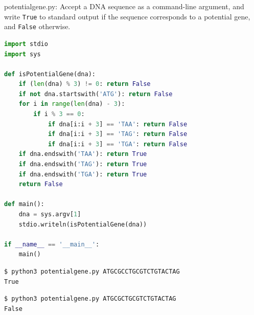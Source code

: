 \documentclass[8pt,a4paper,compress]{beamer}
\begin{document}
\begin{frame}[fragile]
\pause

\begin{framed}
\tiny potentialgene.py: Accept a DNA sequence as a command-line argument, and write \lstinline{True} to standard output if the sequence corresponds to a potential gene, and \lstinline{False} otherwise.
\end{framed}

\begin{lstlisting}[language=Python,style=focusin]
import stdio
import sys

def isPotentialGene(dna):
    if (len(dna) % 3) != 0: return False
    if not dna.startswith('ATG'): return False
    for i in range(len(dna) - 3):
        if i % 3 == 0:
            if dna[i:i + 3] == 'TAA': return False
            if dna[i:i + 3] == 'TAG': return False
            if dna[i:i + 3] == 'TGA': return False
    if dna.endswith('TAA'): return True
    if dna.endswith('TAG'): return True
    if dna.endswith('TGA'): return True
    return False

def main():
    dna = sys.argv[1]
    stdio.writeln(isPotentialGene(dna))

if __name__ == '__main__':
    main()
\end{lstlisting}

\pause
\bigskip

\begin{lstlisting}[language={},style=focusin]
$ python3 potentialgene.py ATGCGCCTGCGTCTGTACTAG
True
\end{lstlisting}

\pause
\smallskip

\begin{lstlisting}[language={},style=focusin]
$ python3 potentialgene.py ATGCGCTGCGTCTGTACTAG
False
\end{lstlisting}
\end{frame}
\end{document}
